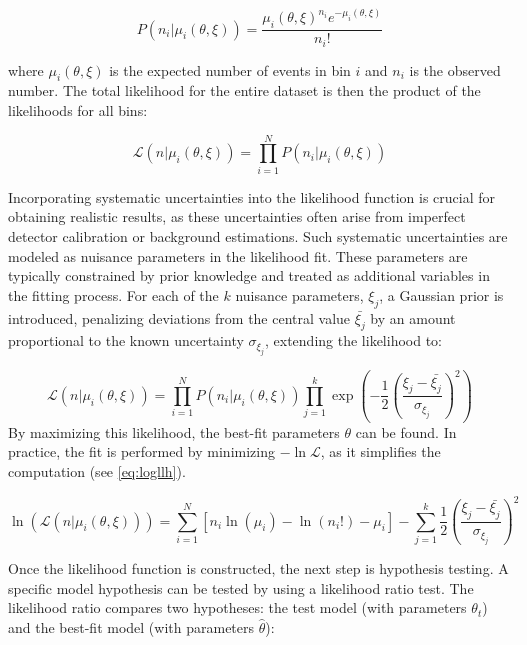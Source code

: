 \begin{equation}\label{eq:Poisson}
    P(n_i|\mu_i(\theta,\xi)) = \frac{\mu_i(\theta,\xi)^{n_i} e^{-\mu_i(\theta,\xi)}}{n_i!}
\end{equation}

where $\mu_i(\theta,\xi)$ is the expected number of events in bin $i$ and $n_i$ is the observed number. The total likelihood for the entire dataset is then the product of the likelihoods for all bins:

\begin{equation}\label{eq:llh_noprior}
    \mathcal{L}(n|\mu_i(\theta,\xi)) = \prod_{i=1}^{N} P(n_i|\mu_i(\theta,\xi))
\end{equation}

Incorporating systematic uncertainties into the likelihood function is crucial for obtaining realistic results, as these uncertainties often arise from imperfect detector calibration or background estimations. Such systematic uncertainties are modeled as nuisance parameters in the likelihood fit. These parameters are typically constrained by prior knowledge and treated as additional variables in the fitting process. For each of the $k$ nuisance parameters, $\xi_j$, a Gaussian prior is introduced, penalizing deviations from the central value $\bar{\xi_j}$ by an amount proportional to the known uncertainty $\sigma_{\xi_j}$, extending the likelihood to:

\begin{equation}\label{eq:llh_withprior}
    \mathcal{L}(n|\mu_i(\theta,\xi)) = \prod_{i=1}^{N} P(n_i|\mu_i(\theta,\xi)) \prod_{j=1}^{k} \exp\left(-\frac{1}{2}\left(\frac{\xi_j - \bar{\xi_j}}{\sigma_{\xi_j}}\right)^2\right)
\end{equation}
By maximizing this likelihood, the best-fit parameters $\theta$ can be found. In practice, the fit is performed by minimizing $-\ln\mathcal{L}$, as it simplifies the computation (see \ref{eq:logllh}). 

\begin{equation}\label{eq:logllh}
    \ln(\mathcal{L}(n|\mu_i(\theta,\xi))) = \sum_{i=1}^{N} \left[ n_i \ln(\mu_i) - \ln(n_i!) - \mu_i \right] 
    - \sum_{j=1}^{k} \frac{1}{2} \left( \frac{\xi_j - \bar{\xi_j}}{\sigma_{\xi_j}} \right)^2
\end{equation}

Once the likelihood function is constructed, the next step is hypothesis testing. A specific model hypothesis can be tested by using a likelihood ratio test. The likelihood ratio compares two hypotheses: the test model (with parameters $\theta_t$) and the best-fit model (with parameters $\hat{\theta}$):

